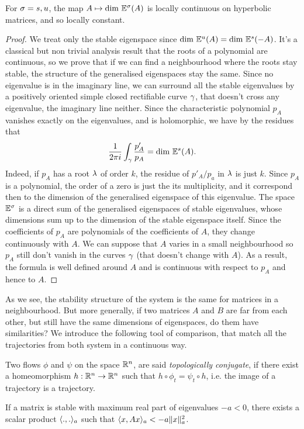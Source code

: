 \begin{theoreme}
For $\sigma=s,u$, the map $A\mapsto \text{dim }\mathbb{E}^\sigma(A)$ is locally continuous on hyperbolic matrices, and so locally constant.
\end{theoreme}
\begin{proof}
We treat only the stable eigenspace since $\text{dim }\mathbb{E}^u(A) =\text{dim }\mathbb{E}^s(-A)$. It's a classical but non trivial analysis result that the roots of a polynomial are continuous, so we prove that if we can find a neighbourhood where the roots stay stable, the structure of the generalised eigenspaces stay the same. Since no eigenvalue is in the imaginary line, we can surround all the stable eigenvalues by a positively oriented simple closed rectifiable curve $\gamma$, that doesn't cross any eigenvalue, the imaginary line neither. Since the characteristic polynomial $p_A$ vanishes exactly on the eigenvalues, and is holomorphic, we have by the residues that 
$$\frac{1}{2\pi i}\int_{\gamma} \frac{p_A'}{p_A}
= \text{dim }\mathbb{E}^s(A) .$$
Indeed, if $p_A$ has a root $\lambda$ of order $k$, the residue of $p'_A/p_a$ in $\lambda$ is just $k$. Since $p_A$ is a polynomial, the order of a zero is just the its multiplicity, and it correspond then to the dimension of the generalised eigenspace of this eigenvalue. The space $\mathbb{E}^\sigma$ is a direct sum of the generalised eigenspaces of stable eigenvalues, whose dimensions sum up to the dimension of the stable eigenspace itself. Since the coefficients of $p_A$ are polynomials of the coefficients of $A$, they change continuously with $A$. We can suppose that $A$ varies in a small neighbourhood so $p_A$ still don't vanish in the curves $\gamma$ (that doesn't change with $A$). As a result, the formula is well defined around $A$ and is continuous with respect to $p_A$ and hence to $A$.
\end{proof}
 As we see, the stability structure of the system is the same for matrices in a neighbourhood. But more generally, if two matrices $A$ and $B$ are far from each other, but still have the same dimensions of eigenspaces, do them have similarities? We introduce the following tool of comparison, that match all the trajectories from both system in a continuous way. 
 \begin{definition}
 Two flows $\phi$ and $\psi$ on the space $\mathbb{R}^n$, are said \emph{topologically conjugate}, if there exist a homeomorphism $h:\mathbb{R}^n\to\mathbb{R}^n$ such that 
 $h\circ \phi_t = \psi_t\circ h$, i.e. the image of a trajectory is a trajectory. 
 \end{definition}
 \begin{lemme} \label{lem:ps}
If a matrix is stable with maximum real part of eigenvalues $-a<0$, there exists a scalar product $\langle.,.\rangle_a$ such that $\langle x,Ax\rangle_a<-a\|x\|_a^2$.
\end{lemme}
